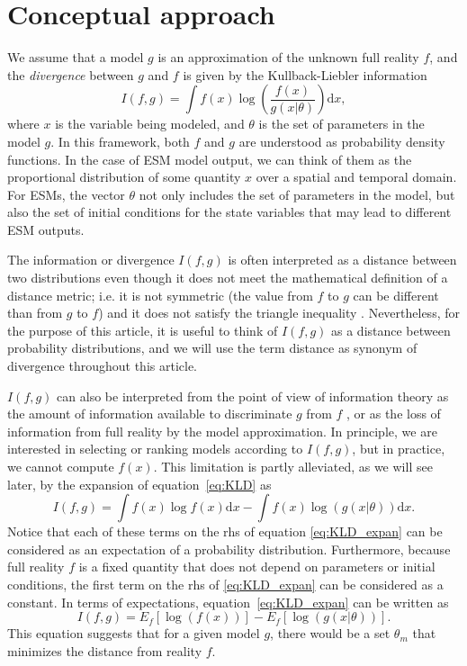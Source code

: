 \documentclass[gmd, manuscript]{copernicus}
\newcommand{\dd}{\mathrm{d}}
\begin{document}
\section{Conceptual approach}
We assume that a model $g$ is an approximation of the unknown full reality $f$, and the \emph{divergence} between $g$ and $f$ is given by the Kullback-Liebler information
\begin{equation} \label{eq:KLD}
I(f, g) = \int f(x) \log \left( \frac{f(x)}{g(x | \theta)} \right) \dd x,
\end{equation}
where $x$ is the variable being modeled, and $\theta$ is the set of parameters in the model $g$. 
In this framework, both $f$ and $g$ are understood as probability density functions. In the case of ESM model output, we can think of them as the proportional distribution of some quantity $x$ over a spatial and temporal domain. 
For ESMs, the vector $\theta$ not only includes the set of parameters in the model, but also the set of initial conditions for the state variables that may lead to different ESM outputs. 

The information or divergence $I(f, g)$ is often interpreted as a distance between two distributions even though it does not meet the mathematical definition of a distance metric; i.e. it is not symmetric (the value from $f$ to $g$ can be different than from $g$ to $f$) and it does not satisfy the triangle inequality \citep{Cover2006}. 
Nevertheless, for the purpose of this article, it is useful to think of $I(f, g)$ as a distance between probability distributions, and we will use the term distance as synonym of divergence throughout this article. 

$I(f, g)$ can also be interpreted from the point of view of information theory as the amount of information available to discriminate $g$ from $f$ \citep{Kullback1951}, or as the loss of information from full reality by the model approximation. In principle, we are interested in selecting or ranking models according to $I(f, g)$, but in practice, we cannot compute $f(x)$. 
This limitation is partly alleviated, as we will see later, by the expansion of equation~\ref{eq:KLD} as
\begin{equation} \label{eq:KLD_expan}
I(f, g) = \int f(x) \log f(x) \dd x - \int f(x) \log (g(x | \theta)) \dd x.
\end{equation}
Notice that each of these terms on the rhs of equation \ref{eq:KLD_expan} can be considered as an expectation of a probability distribution. Furthermore, because full reality $f$ is a fixed quantity that does not depend on parameters or initial conditions, the first term on the rhs of \ref{eq:KLD_expan} can be considered as a constant. In terms of expectations, equation~\ref{eq:KLD_expan} can be written as
\begin{equation}\label{eq:KLD_expect}
I(f, g)  = E_f[ \log(f(x)) ] - E_f [ \log (g(x | \theta)) ].
\end{equation}
This equation suggests that for a given model $g$, there would be a set $\theta_m$ that minimizes the distance from reality $f$. 
\end{document}
